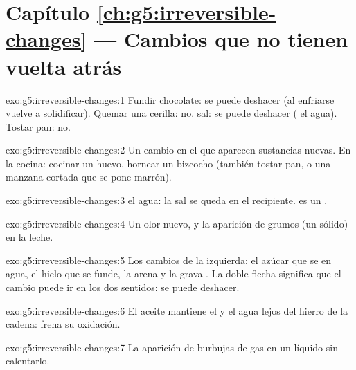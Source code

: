 \section*{Capítulo \ref{ch:g5:irreversible-changes} --- Cambios que no tienen vuelta atrás}

\begin{solution}{exo:g5:irreversible-changes:1}
Fundir chocolate: se puede deshacer (al enfriarse vuelve a solidificar).
Quemar una cerilla: no.  sal: se puede deshacer ( el
agua). Tostar pan: no.
\end{solution}

\begin{solution}{exo:g5:irreversible-changes:2}
Un cambio en el que aparecen sustancias nuevas. En la cocina: cocinar
un huevo, hornear un bizcocho (también tostar pan, o una manzana
cortada que se pone marrón).
\end{solution}

\begin{solution}{exo:g5:irreversible-changes:3}
 el agua: la sal se queda en el recipiente.  es un
.
\end{solution}

\begin{solution}{exo:g5:irreversible-changes:4}
Un olor nuevo, y la aparición de grumos (un sólido) en la leche.
\end{solution}

\begin{solution}{exo:g5:irreversible-changes:5}
Los cambios de la izquierda: el azúcar que se  en agua, el
hielo que se funde, la arena y la grava . La doble flecha
significa que el cambio puede ir en los dos sentidos: se puede deshacer.
\end{solution}

\begin{solution}{exo:g5:irreversible-changes:6}
El aceite mantiene el  y el agua lejos del hierro de la cadena:
frena su oxidación.
\end{solution}

\begin{solution}{exo:g5:irreversible-changes:7}
La aparición de burbujas de gas en un líquido sin calentarlo.
\end{solution}

